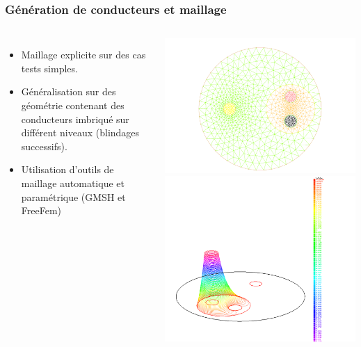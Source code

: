 \begin{frame}
  \frametitle{G\'en\'eration de conducteurs et maillage}
  \begin{columns}[T]
    \begin{itemize}
      \item Maillage explicite sur des cas tests simples.
      \item G\'en\'eralisation sur des g\'eom\'etrie contenant des conducteurs
        imbriqu\'e sur diff\'erent niveaux (blindages successifs).
      \item Utilisation d'outils de maillage automatique et param\'etrique (GMSH et FreeFem)
    \end{itemize}
    \centering
    \includegraphics[width=.7\linewidth]{figures/figures/gui/mesh-1.pdf}\\
    \includegraphics[width=.7\linewidth]{figures/figures/gui/sol3D-1.pdf}
  \end{columns}
\end{frame}

